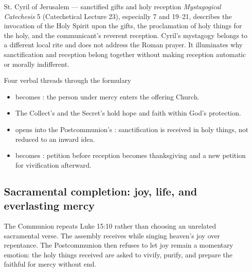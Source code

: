 \begin{sourcecard}{St. Cyril of Jerusalem --- sanctified gifts and holy reception}
\emph{Mystagogical Catechesis} 5 (Catechetical Lecture 23), especially 7 and 19--21, describes the invocation of the Holy Spirit upon the gifts, the proclamation of holy things for the holy, and the communicant's reverent reception. Cyril's mystagogy belongs to a different local rite and does not address the Roman prayer. It illuminates why sanctification and reception belong together without making reception automatic or morally indifferent.
\end{sourcecard}

\begin{studybox}{Four verbal threads through the formulary}
\begin{itemize}
\item {} becomes : the person under mercy enters the offering Church.
\item The Collect's  and the Secret's  hold hope and faith within God's protection.
\item {} opens into the Postcommunion's : sanctification is received in holy things, not reduced to an inward idea.
\item {} becomes : petition before reception becomes thanksgiving and a new petition for vivification afterward.
\end{itemize}
\end{studybox}

\sectionguard
\subsection*{Sacramental completion: joy, life, and everlasting mercy\enspace{}}

The Communion repeats Luke 15:10 rather than choosing an unrelated sacramental verse. The assembly receives while singing heaven's joy over repentance. The Postcommunion then refuses to let joy remain a momentary emotion: the holy things received are asked to vivify, purify, and prepare the faithful for mercy without end.

